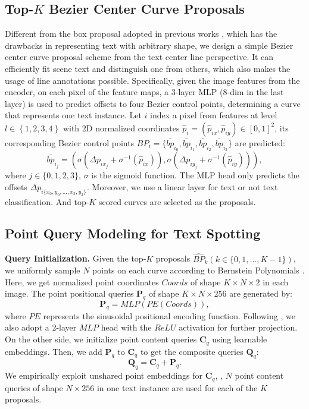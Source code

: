 \documentclass[10pt,twocolumn,letterpaper]{article}
\begin{document}
\subsection{Top-$K$ Bezier Center Curve Proposals}
\label{sec:top-k proposal}
Different from the box proposal adopted in previous works \cite{zhu2020deformable, zhang2022text, jia2022detrs, ye2022dptext, zhang2022dino}, which has the drawbacks in representing text with arbitrary shape, we design a simple Bezier center curve proposal scheme from the text center line perspective. It can efficiently fit scene text and distinguish one from others, which also makes the usage of line annotations possible. Specifically, given the image features from the encoder, on each pixel of the feature maps, a 3-layer MLP (8-dim in the last layer) is used to predict offsets to four Bezier control points, determining a curve that represents one text instance. Let $i$ index a pixel from features at level $l \in \left\{1,2,3,4\right\}$ with 2D normalized coordinates $\hat{p}_i = \left(\hat{p}_{ix}, \hat{p}_{iy}\right) \in \left[0,1\right]^2$, its corresponding Bezier control points $BP_i = \{\bar{bp}_{i_0}, \bar{bp}_{i_1}, \bar{bp}_{i_2}, \bar{bp}_{i_3}\}$ are predicted:
\begin{equation}
    \bar{bp}_{i_j} = (\sigma(\Delta p_{ix_j} + \sigma^{-1}(\hat{p}_{ix})), \sigma(\Delta p_{iy_j} + \sigma^{-1}(\hat{p}_{iy}))), \label{eq_1}
\end{equation}
where $j \in \{0,1,2,3\}$, $\sigma$ is the sigmoid function. The MLP head only predicts the offsets $\Delta p_{i\{x_0,y_0,\ldots,x_3,y_3\}}$. Moreover, we use a linear layer for text or not text classification. And top-$K$ scored curves are selected as the proposals.

\subsection{Point Query Modeling for Text Spotting}
\noindent \textbf{Query Initialization.} Given the top-$K$ proposals $\hat{BP}_k (k \in \{0,1,\ldots,K-1\})$, we uniformly sample $N$ points on each curve according to Bernstein Polynomials \cite{lorentz2013bernstein}. Here, we get normalized point coordinates $Coords$ of shape $K \times N \times 2$ in each image. The point positional queries $\textbf{P}_{q}$ of shape $K \times N \times 256$ are generated by:
\begin{equation}
    \textbf{P}_{q} = MLP(PE(Coords)), \label{eq_2}
\end{equation}
where $PE$ represents the sinusoidal positional encoding function. Following \cite{liu2022dab}, we also adopt a 2-layer $MLP$ head with the $ReLU$ activation for further projection. On the other side, we initialize point content queries $\textbf{C}_{q}$ using learnable embeddings. Then, we add $\textbf{P}_{q}$ to $\textbf{C}_{q}$ to get the composite queries $\textbf{Q}_q$:
\begin{equation}
    \textbf{Q}_q = \textbf{C}_{q} + \textbf{P}_{q}. \label{eq_3}
\end{equation}
We empirically exploit unshared point embeddings for $\textbf{C}_{q}$, \ie, $N$ point content queries of shape $N \times 256$ in one text instance are used for each of the $K$ proposals.
\end{document}
